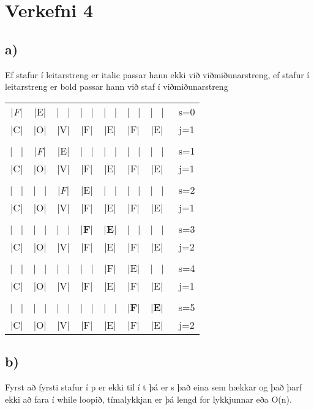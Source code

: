 \documentclass{article}
\begin{document}
\newpage
\section*{Verkefni 4}
\subsection*{a)}
Ef stafur í leitarstreng er italic passar hann ekki við viðmiðunarstreng, ef stafur í leitarstreng er bold passar hann við staf í viðmiðunarstreng

\begin{center}
    \begin{tabular}{c c c c c c c c}
        |\textit{F}|&|E|&| \ |&| \ |&| \ |&| \ |&| \ | & \ s=0\\
        |C|&|O|&|V|&|F|&|E|&|F|&|E| & \ j=1\\
        \\
        | \ |&|\textit{F}|&|E|&| \ |&| \ |&| \ |&| \ | & \ s=1\\
        |C|&|O|&|V|&|F|&|E|&|F|&|E| & \ j=1\\
        \\
        | \ |&| \ |&|\textit{F}|&|E|&| \ |&| \ |&| \ | & \ s=2\\
        |C|&|O|&|V|&|F|&|E|&|F|&|E| & \ j=1\\
        \\
        | \ |&| \ |&| \ |&|\textbf{F}|&|\textbf{E}|&| \ |&| \ | & \ s=3\\
        |C|&|O|&|V|&|F|&|E|&|F|&|E| & \ j=2\\
        \\
        | \ |&| \ |&| \ |&| \ |&|F|&|E|&| \ | & \ s=4\\
        |C|&|O|&|V|&|F|&|E|&|F|&|E| & \ j=1\\
        \\
        | \ |&| \ |&| \ |&| \ |&| \ |&|\textbf{F}|&|\textbf{E}| & \ s=5\\
        |C|&|O|&|V|&|F|&|E|&|F|&|E| & \ j=2\\
    \end{tabular}
\end{center}

\subsection*{b)}
Fyrst að fyrsti stafur í p er ekki til í t þá er s það eina sem hækkar og það þarf ekki að fara í while loopið, tímalykkjan er þá lengd for lykkjunnar eða O(n).
\end{document}
